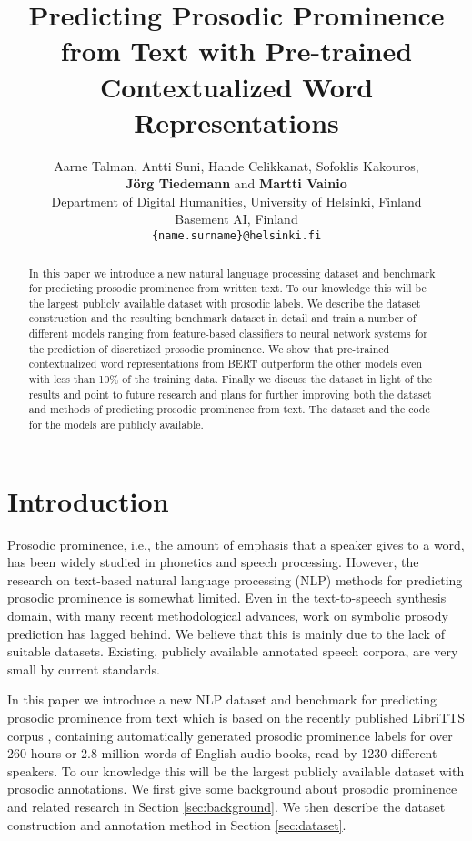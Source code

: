 \documentclass[11pt]{article}
\title{Predicting Prosodic Prominence from Text with Pre-trained Contextualized Word Representations}
\author{
Aarne Talman,\textsuperscript{ } Antti Suni,\textsuperscript{} Hande Celikkanat,\textsuperscript{} Sofoklis Kakouros,\textsuperscript{}\\{\bf J\"org Tiedemann\textsuperscript{}} and {\bf Martti Vainio\textsuperscript{}}\\
\textsuperscript{}Department of Digital Humanities, University of Helsinki, Finland\\
\textsuperscript{}Basement AI, Finland \\
\texttt{\{name.surname\}@helsinki.fi}
}
\date{}
\begin{document}
\maketitle

\begin{abstract}
 In this paper we introduce a new natural language processing dataset and benchmark for predicting prosodic prominence from written text. To our knowledge this will be the largest publicly available dataset with prosodic labels. We describe the dataset construction and the resulting benchmark dataset in detail and train a number of different models ranging from feature-based classifiers to neural network systems for the prediction of discretized prosodic prominence. We show that pre-trained contextualized word representations from BERT outperform the other models even with less than 10\% of the training data. Finally we discuss the dataset in light of the results and point to future research and plans for further improving both the dataset and methods of predicting prosodic prominence from text. The dataset and the code for the models are publicly available.
\end{abstract}

\section{Introduction}
Prosodic prominence, i.e., the amount of emphasis that a speaker gives to a word, has been widely studied in phonetics and speech processing. However, the research on text-based natural language processing (NLP) methods for predicting prosodic prominence is somewhat limited. Even in the text-to-speech synthesis domain, with many recent methodological advances, work on symbolic prosody prediction has lagged behind. We believe that this is mainly due to the lack of suitable datasets. Existing, publicly available annotated speech corpora, are very small by current standards.

In this paper we introduce a new NLP dataset and benchmark for predicting prosodic prominence from text which is based on the recently published LibriTTS corpus \cite{zen2019libritts}, containing automatically generated prosodic prominence labels for over 260 hours or 2.8 million words of English audio books, read by 1230 different speakers. To our knowledge this will be the largest publicly available dataset with prosodic annotations. We first give some background about prosodic prominence and related research in Section \ref{sec:background}. We then describe the dataset construction and annotation method in Section \ref{sec:dataset}.
\end{document}

